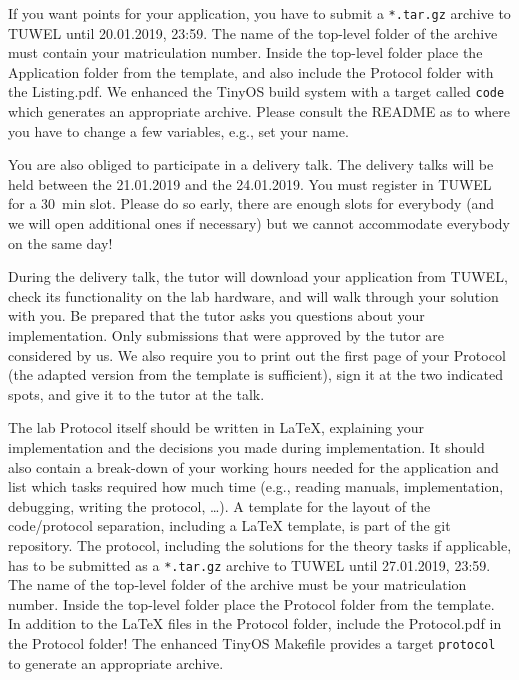 \documentclass[a4paper,10pt]{article}
\begin{document}
If you want points for your application, you have to submit a
	\texttt{*.tar.gz} archive to TUWEL until 20.01.2019, 23:59.
The name of the top-level folder of the archive must contain your
	matriculation number.
Inside the top-level folder place the Application folder from the template,
	and also include the Protocol folder with the Listing.pdf.
We enhanced the TinyOS build system with a target called \texttt{code} which
	generates  an appropriate archive.
Please consult the README as to where you have to change a few variables,
	e.g., set your name.

You are also obliged to participate in a delivery talk.
The delivery talks will be held between the 21.01.2019 and the 24.01.2019.
You must register in TUWEL for a \SI{30}{\minute} slot.
Please do so early, there are enough slots for everybody (and we will open
	additional ones if necessary) but we cannot accommodate everybody on the
	same day!

During the delivery talk, the tutor will download your application from TUWEL,
	check its functionality on the lab hardware, and will walk through your
	solution with you.
Be prepared that the tutor asks you questions about your implementation.
Only submissions that were approved by the tutor are considered by us.
We also require you to print out the first page of your Protocol (the adapted
version from the template is sufficient), sign it at the two indicated spots, and
give it to the tutor at the talk.

The lab Protocol itself should be written in \LaTeX{}, explaining your implementation
	and the decisions you made during implementation.
It should also contain a break-down of your working hours needed for the
	application and list which tasks required how much time (e.g.,
	reading manuals, implementation, debugging, writing the protocol, \dots).
A template for the layout of the code/protocol separation, including a \LaTeX{}
	template, is part of the git repository.
The protocol, including the solutions for the theory tasks if applicable, has
	to be submitted as a \texttt{*.tar.gz} archive to TUWEL until 27.01.2019,
	23:59.
The name of the top-level folder of the archive must be your
	matriculation number.
Inside the top-level folder place the Protocol folder from the template.
In addition to the \LaTeX{} files in the Protocol folder, include the
	Protocol.pdf in the Protocol folder!
The enhanced TinyOS Makefile provides a target \texttt{protocol} to generate
	an appropriate archive.
\end{document}
